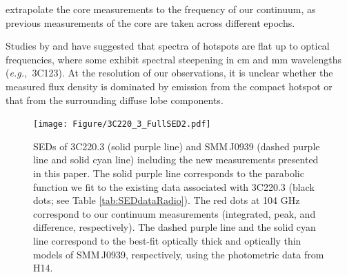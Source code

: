 \documentclass[twocolumn,apj,numberedappendix]{emulateapj}
\newcommand{\eg}{{\sl e.g.,~}}
\begin{document}
 extrapolate the core measurements to the frequency of our continuum, as previous measurements of the core are 
 taken 
 across different epochs. 
\par
Studies by \citet{Meisenheimer89a} and \citet{Hardcastle08a} have suggested that spectra of hotspots are flat up to optical frequencies, where some exhibit spectral steepening in cm and mm wavelengths (\eg 3C123). At the resolution of our observations, it is unclear whether the measured flux density is dominated by emission from the compact hotspot or that from the surrounding diffuse lobe components.

\begin{figure}[!tbph]
\centering
\texttt{[image: Figure/3C220\_3\_FullSED2.pdf]}
\caption{SEDs of 3C220.3 (solid purple line) and SMM\,J0939 (dashed purple line and solid cyan line) including the new measurements presented in this paper.
The solid purple line corresponds to the parabolic function we
fit to the existing data associated with 3C220.3 (black dots; see Table \ref{tab:SEDdataRadio}).
The red dots at 104 GHz correspond to
our continuum measurements (integrated, peak, and difference, respectively).
The dashed purple line and
the solid cyan line correspond to the best-fit optically thick and optically thin models of SMM\,J0939, respectively, using the photometric data from H14. \label{fig:SED}}
\end{figure}
\end{document}
